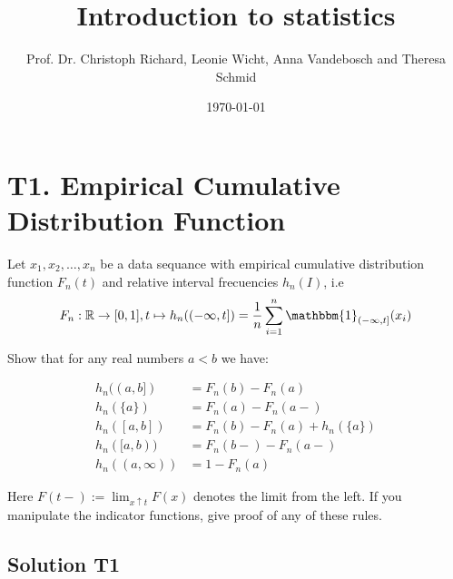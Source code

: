 \documentclass[12pt]{article}
\title{Introduction to statistics}
\author{Prof. Dr. Christoph Richard, Leonie Wicht, Anna Vandebosch and Theresa Schmid}
\date{\today}
\begin{document}
\maketitle

\section*{T1. Empirical Cumulative Distribution Function}

Let $x_1, x_2, \ldots, x_n$ be a data sequance with empirical cumulative distribution function $F_n(t)$ and relative interval frecuencies $h_n(I)$, i.e
\[
F_n: \mathbb{R} \rightarrow [0,1], t \mapsto h_n((-\infty,t])=\frac{1}{n}\sum_{i=1}^n \mathbbm{1}_{(-\infty,t]}(x_i)
\]


Show that for any real numbers $a < b$ we have:

\begin{align*}
h_n((a,b]) &= F_n(b) - F_n(a)\\
h_n(\{a\}) &= F_n(a)-F_n(a-)\\
h_n([a,b]) &= F_n(b)-F_n(a)+h_n(\{a\})\\
h_n([a,b)) &= F_n(b-)-F_n(a-)\\
h_n((a,\infty)) &= 1-F_n(a)
\end{align*}

Here $F(t-):=\lim_{x\uparrow t}F(x)$ denotes the limit from the left. If you manipulate the indicator functions, give proof of any of these rules.


\subsection*{Solution T1}
\end{document}
